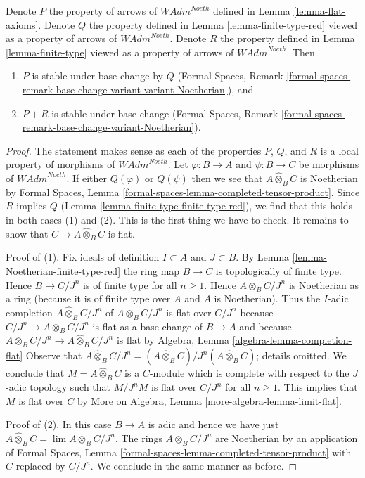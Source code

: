 \begin{lemma}
\label{lemma-base-change-flat-continuous}
Denote $P$ the property of arrows of $\textit{WAdm}^{Noeth}$
defined in Lemma \ref{lemma-flat-axioms}.
Denote $Q$ the property defined in Lemma \ref{lemma-finite-type-red}
viewed as a property of arrows of $\textit{WAdm}^{Noeth}$.
Denote $R$ the property defined in Lemma \ref{lemma-finite-type}
viewed as a property of arrows of $\textit{WAdm}^{Noeth}$. Then
\begin{enumerate}
\item $P$ is stable under base change by $Q$
(Formal Spaces, Remark
\ref{formal-spaces-remark-base-change-variant-variant-Noetherian}), and
\item $P + R$ is stable under base change
(Formal Spaces, Remark
\ref{formal-spaces-remark-base-change-variant-Noetherian}).
\end{enumerate}
\end{lemma}

\begin{proof}
The statement makes sense as each of the properties $P$, $Q$, and $R$
is a local property of morphisms of $\textit{WAdm}^{Noeth}$.
Let $\varphi : B \to A$ and $\psi : B \to C$ be morphisms of
$\textit{WAdm}^{Noeth}$. If either $Q(\varphi)$ or $Q(\psi)$
then we see that $A \widehat{\otimes}_B C$ is Noetherian by
Formal Spaces, Lemma \ref{formal-spaces-lemma-completed-tensor-product}.
Since $R$ implies $Q$ (Lemma \ref{lemma-finite-type-finite-type-red}),
we find that this holds in both cases (1) and (2).
This is the first thing we have to check. It remains to show
that $C \to A \widehat{\otimes}_B C$ is flat.

\medskip\noindent
Proof of (1). Fix ideals of definition $I \subset A$ and $J \subset B$.
By Lemma \ref{lemma-Noetherian-finite-type-red} the ring map
$B \to C$ is topologically of finite type. Hence
$B \to C/J^n$ is of finite type for all $n \geq 1$.
Hence $A \otimes_B C/J^n$ is Noetherian as a ring
(because it is of finite type over $A$ and $A$ is Noetherian).
Thus the $I$-adic completion $A \widehat{\otimes}_B C/J^n$
of $A \otimes_B C/J^n$ is flat over $C/J^n$ because
$C/J^n \to A \otimes_B C/J^n$ is flat as a base change of
$B \to A$ and because
$A \otimes_B C/J^n \to A \widehat{\otimes}_B C/J^n$ is flat by
Algebra, Lemma \ref{algebra-lemma-completion-flat}
Observe that $A \widehat{\otimes}_B C/J^n =
(A \widehat{\otimes}_B C)/J^n(A \widehat{\otimes}_B C)$; details omitted.
We conclude that $M = A \widehat{\otimes}_B C$ is a $C$-module
which is complete with respect to the $J$-adic topology
such that $M/J^nM$ is flat over $C/J^n$ for all $n \geq 1$.
This implies that $M$ is flat over $C$ by
More on Algebra, Lemma \ref{more-algebra-lemma-limit-flat}.

\medskip\noindent
Proof of (2). In this case $B \to A$ is adic and hence we have just
$A \widehat{\otimes}_B C = \lim A \otimes_B C/J^n$.
The rings $A \otimes_B C/J^n$ are Noetherian by an application of 
Formal Spaces, Lemma \ref{formal-spaces-lemma-completed-tensor-product}
with $C$ replaced by $C/J^n$.
We conclude in the same manner as before.
\end{proof}

